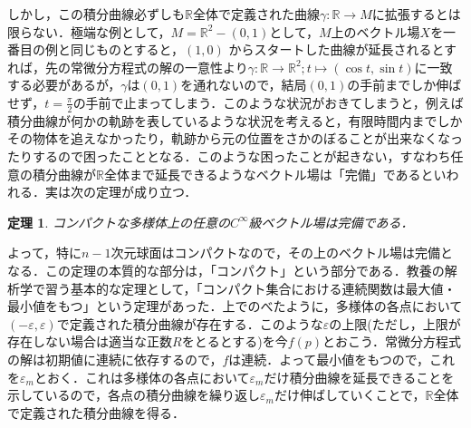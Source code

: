 \documentclass{jsarticle}
\def\realnum{{\mathbb R}}
\newtheorem{theo}{定理}
\begin{document}
しかし，この積分曲線必ずしも$\realnum$全体で定義された曲線$\gamma:\realnum\rightarrow M$に拡張するとは限らない．極端な例として，$M=\realnum^2-{(0,1)}$として，$M$上のベクトル場$X$を一番目の例と同じものとすると，$(1,0)$
からスタートした曲線が延長されるとすれば，先の常微分方程式の解の一意性より$\gamma:\realnum\rightarrow \realnum^2;t\mapsto (\cos t,\sin t)$に一致する必要があるが，$\gamma$は$(0,1)$を通れないので，結局$(0,1)$の手前までしか伸ばせず，$t=\frac{\pi}{2}$の手前で止まってしまう．このような状況がおきてしまうと，例えば積分曲線が何かの軌跡を表しているような状況を考えると，有限時間内までしかその物体を追えなかったり，軌跡から元の位置をさかのぼることが出来なくなったりするので困ったこととなる．このような困ったことが起きない，すなわち任意の積分曲線が$\realnum$全体まで延長できるようなベクトル場は「完備」であるといわれる．実は次の定理が成り立つ．
\begin{theo}
コンパクトな多様体上の任意の$C^\infty$級ベクトル場は完備である．
\end{theo}
よって，特に$n-1$次元球面はコンパクトなので，その上のベクトル場は完備となる．この定理の本質的な部分は，「コンパクト」という部分である．教養の解析学で習う基本的な定理として，「コンパクト集合における連続関数は最大値・最小値をもつ」という定理があった．上でのべたように，多様体の各点において$(-\varepsilon,\varepsilon)$で定義された積分曲線が存在する．このような$\varepsilon$の上限(ただし，上限が存在しない場合は適当な正数$R$をとるとする)を今$f(p)$とおこう．常微分方程式の解は初期値に連続に依存するので，$f$は連続．よって最小値をもつので，これを$\varepsilon_m$とおく．これは多様体の各点において$\varepsilon_m$だけ積分曲線を延長できることを示しているので，各点の積分曲線を繰り返し$\varepsilon_m$だけ伸ばしていくことで，$\realnum$全体で定義された積分曲線を得る．
\end{document}
